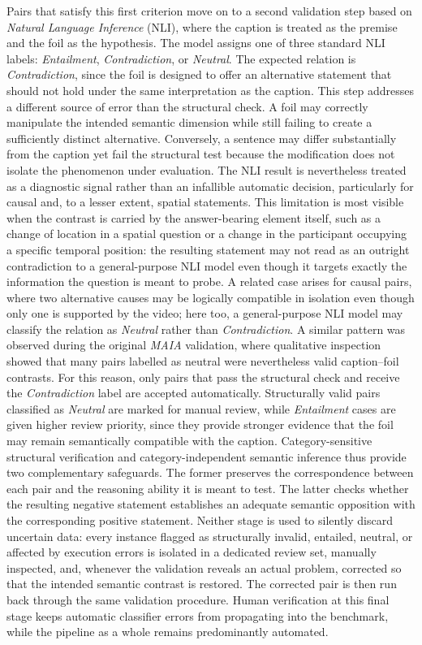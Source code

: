 Pairs that satisfy this first criterion move on to a second validation step based on \textit{Natural Language Inference} (NLI), where the caption is treated as the premise and the foil as the hypothesis. The model assigns one of three standard NLI labels: \textit{Entailment}, \textit{Contradiction}, or \textit{Neutral}. The expected relation is \textit{Contradiction}, since the foil is designed to offer an alternative statement that should not hold under the same interpretation as the caption. This step addresses a different source of error than the structural check. A foil may correctly manipulate the intended semantic dimension while still failing to create a sufficiently distinct alternative. Conversely, a sentence may differ substantially from the caption yet fail the structural test because the modification does not isolate the phenomenon under evaluation.
The NLI result is nevertheless treated as a diagnostic signal rather than an infallible automatic decision, particularly for causal and, to a lesser extent, spatial statements. This limitation is most visible when the contrast is carried by the answer-bearing element itself, such as a change of location in a spatial question or a change in the participant occupying a specific temporal position: the resulting statement may not read as an outright contradiction to a general-purpose NLI model even though it targets exactly the information the question is meant to probe. A related case arises for causal pairs, where two alternative causes may be logically compatible in isolation even though only one is supported by the video; here too, a general-purpose NLI model may classify the relation as \textit{Neutral} rather than \textit{Contradiction}. A similar pattern was observed during the original \textit{MAIA} validation, where qualitative inspection showed that many pairs labelled as neutral were nevertheless valid caption--foil contrasts. For this reason, only pairs that pass the structural check and receive the \textit{Contradiction} label are accepted automatically. Structurally valid pairs classified as \textit{Neutral} are marked for manual review, while \textit{Entailment} cases are given higher review priority, since they provide stronger evidence that the foil may remain semantically compatible with the caption.
Category-sensitive structural verification and category-independent semantic inference thus provide two complementary safeguards. The former preserves the correspondence between each pair and the reasoning ability it is meant to test. The latter checks whether the resulting negative statement establishes an adequate semantic opposition with the corresponding positive statement. Neither stage is used to silently discard uncertain data: every instance flagged as structurally invalid, entailed, neutral, or affected by execution errors is isolated in a dedicated review set, manually inspected, and, whenever the validation reveals an actual problem, corrected so that the intended semantic contrast is restored. The corrected pair is then run back through the same validation procedure. Human verification at this final stage keeps automatic classifier errors from propagating into the benchmark, while the pipeline as a whole remains predominantly automated.
